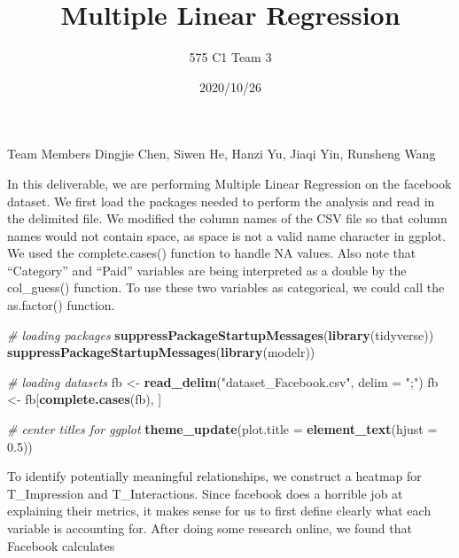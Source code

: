 \documentclass[
]{article}
\title{Multiple Linear Regression}
\author{575 C1 Team 3}
\date{2020/10/26}
\newenvironment{Shaded}{\begin{snugshade}}{\end{snugshade}}
\newcommand{\CommentTok}[1]{\textcolor[rgb]{0.56,0.35,0.01}{\textit{#1}}}
\newcommand{\DataTypeTok}[1]{\textcolor[rgb]{0.13,0.29,0.53}{#1}}
\newcommand{\FloatTok}[1]{\textcolor[rgb]{0.00,0.00,0.81}{#1}}
\newcommand{\KeywordTok}[1]{\textcolor[rgb]{0.13,0.29,0.53}{\textbf{#1}}}
\newcommand{\NormalTok}[1]{#1}
\newcommand{\StringTok}[1]{\textcolor[rgb]{0.31,0.60,0.02}{#1}}
\begin{document}
\maketitle

Team Members Dingjie Chen, Siwen He, Hanzi Yu, Jiaqi Yin, Runsheng Wang

In this deliverable, we are performing Multiple Linear Regression on the
facebook dataset. We first load the packages needed to perform the
analysis and read in the delimited file. We modified the column names of
the CSV file so that column names would not contain space, as space is
not a valid name character in ggplot. We used the complete.cases()
function to handle NA values. Also note that ``Category'' and ``Paid''
variables are being interpreted as a double by the col\_guess()
function. To use these two variables as categorical, we could call the
as.factor() function.

\begin{Shaded}
\begin{Highlighting}[]
\CommentTok{# loading packages}
\KeywordTok{suppressPackageStartupMessages}\NormalTok{(}\KeywordTok{library}\NormalTok{(tidyverse))}
\KeywordTok{suppressPackageStartupMessages}\NormalTok{(}\KeywordTok{library}\NormalTok{(modelr))}

\CommentTok{# loading datasets}
\NormalTok{fb <-}\StringTok{ }\KeywordTok{read_delim}\NormalTok{(}\StringTok{"dataset_Facebook.csv"}\NormalTok{, }\DataTypeTok{delim =} \StringTok{";"}\NormalTok{)}
\NormalTok{fb <-}\StringTok{ }\NormalTok{fb[}\KeywordTok{complete.cases}\NormalTok{(fb), ]}

\CommentTok{# center titles for ggplot}
\KeywordTok{theme_update}\NormalTok{(}\DataTypeTok{plot.title =} \KeywordTok{element_text}\NormalTok{(}\DataTypeTok{hjust =} \FloatTok{0.5}\NormalTok{))}
\end{Highlighting}
\end{Shaded}

To identify potentially meaningful relationships, we construct a heatmap
for T\_Impression and T\_Interactions. Since facebook does a horrible
job at explaining their metrics, it makes sense for us to first define
clearly what each variable is accounting for. After doing some research
online, we found that Facebook calculates
\end{document}
